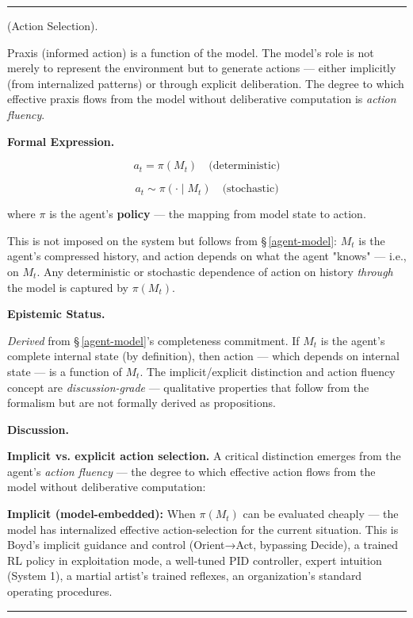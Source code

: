 \documentclass[11pt,oneside]{article}
\newcounter{claim}[section]
\renewcommand{\theclaim}{\thesection.\arabic{claim}}
\newenvironment{segment}[2]{%
  \refstepcounter{claim}%
  \bigskip\noindent\hrule\smallskip
  \noindent{\bfseries #1~\theclaim}\enskip(#2).\par\smallskip
  \noindent\ignorespaces
}{%
  \par\smallskip\noindent\hrule\bigskip
}
\newenvironment{proposition}[1][]{\begin{segment}{Proposition}{#1}}{\end{segment}}
\begin{document}
\begin{proposition}[Action Selection]
\label{action-selection}
Praxis (informed action) is a function of the model. The model's role is not merely to represent the environment but to generate actions — either implicitly (from internalized patterns) or through explicit deliberation. The degree to which effective praxis flows from the model without deliberative computation is \textit{action fluency}.



\medskip\noindent\textbf{Formal Expression.}



$$a_t = \pi(M_t) \quad \text{(deterministic)}$$

$$a_t \sim \pi(\cdot \mid M_t) \quad \text{(stochastic)}$$

where $\pi$ is the agent's \textbf{policy} — the mapping from model state to action.

This is not imposed on the system but follows from \S\,\ref{agent-model}: $M_t$ is the agent's compressed history, and action depends on what the agent "knows" — i.e., on $M_t$. Any deterministic or stochastic dependence of action on history \textit{through} the model is captured by $\pi(M_t)$.


\medskip\noindent\textbf{Epistemic Status.}


\textit{Derived} from \S\,\ref{agent-model}'s completeness commitment. If $M_t$ is the agent's complete internal state (by definition), then action — which depends on internal state — is a function of $M_t$. The implicit/explicit distinction and action fluency concept are \textit{discussion-grade} — qualitative properties that follow from the formalism but are not formally derived as propositions.


\medskip\noindent\textbf{Discussion.}


\textbf{Implicit vs. explicit action selection.} A critical distinction emerges from the agent's \textit{action fluency} — the degree to which effective action flows from the model without deliberative computation:

\textbf{Implicit (model-embedded):} When $\pi(M_t)$ can be evaluated cheaply — the model has internalized effective action-selection for the current situation. This is Boyd's implicit guidance and control (Orient→Act, bypassing Decide), a trained RL policy in exploitation mode, a well-tuned PID controller, expert intuition (System 1), a martial artist's trained reflexes, an organization's standard operating procedures.


\end{proposition}
\end{document}
